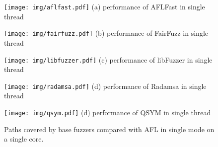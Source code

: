 
\begin{figure*}[!htb]
\centering
\begin{minipage}[!htbp]{0.19\textwidth}
     \centering
     \texttt{[image: img/aflfast.pdf]}
     \small{(a) performance of AFLFast in single thread}
\end{minipage}
\begin{minipage}[!htbp]{0.19\textwidth}
     \centering
     \texttt{[image: img/fairfuzz.pdf]}     
     \small{(b) performance of FairFuzz in single thread}
\end{minipage}
\begin{minipage}[!htbp]{0.19\textwidth}
     \centering
     \texttt{[image: img/libfuzzer.pdf]}     
     \small{(c) performance of libFuzzer  in single thread}
\end{minipage}
\begin{minipage}[!htbp]{0.19\textwidth}
     \centering
     \texttt{[image: img/radamsa.pdf]}     
     \small{(d) performance of Radamsa  in single thread}
\end{minipage}
\begin{minipage}[!htbp]{0.19\textwidth}
     \centering
     \texttt{[image: img/qsym.pdf]}     
     \small{(d) performance of QSYM  in single thread}
\end{minipage}
\caption{Paths covered by base fuzzers compared with AFL in single mode on a single core.} %
\label{fig:paths executed compared with AFL}
\end{figure*}



